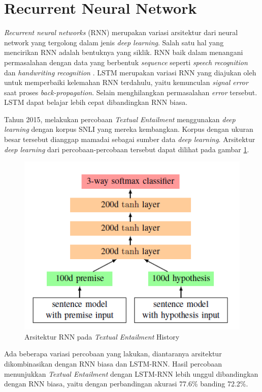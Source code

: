 	
\section{Recurrent Neural Network} \label{rnn-rte}
	\textit{Recurrent neural networks} (RNN) merupakan variasi arsitektur dari neural network yang tergolong dalam jenis \textit{deep learning}. Salah satu hal yang mencirikan RNN adalah bentuknya yang siklik. RNN baik dalam menangani permasalahan dengan data yang berbentuk \textit{sequence} seperti \textit{speech recognition} \citep{6638947} dan \textit{handwriting recognition} \citep{Graves:2009:NCS:1525650.1525782}. LSTM merupakan variasi RNN yang diajukan oleh \cite{Hochreiter:1997:LSM:1246443.1246450} untuk memperbaiki kelemahan RNN terdahulu, yaitu kemunculan \textit{signal error} saat proses \textit{back-propagation}. Selain menghilangkan permasalahan \textit{error} tersebut. LSTM dapat belajar lebih cepat dibandingkan RNN biasa.
	
	Tahun 2015, \cite{snli:emnlp2015} melakukan percobaan \textit{Textual Entailment} menggunakan \textit{deep learning} dengan korpus SNLI yang mereka kembangkan. Korpus dengan ukuran besar tersebut dianggap mamadai sebagai sumber data \textit{deep learning}. Arsitektur \textit{deep learning} dari percobaan-percobaan tersebut dapat dilihat pada gambar \ref{fig:rnn-snli}.
	\begin{figure}
		\centering
		\includegraphics[width=0.6\linewidth]{pics/rnn-snli}
		\caption{Arsitektur RNN pada \textit{Textual Entailment} History \citep{snli:emnlp2015}}
		\label{fig:rnn-snli}
	\end{figure}
	Ada beberapa variasi percobaan yang \cite{snli:emnlp2015} lakukan, diantaranya arsitektur dikombinasikan dengan RNN biasa dan LSTM-RNN. Hasil percobaan menunjukkan \textit{Textual Entailment} dengan LSTM-RNN lebih unggul dibandingkan dengan RNN biasa, yaitu dengan perbandingan akurasi 77.6\% banding 72.2\%.
	
